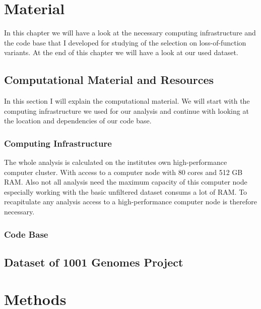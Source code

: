 \chapter{Material}
In this chapter we will have a look at the necessary computing infrastructure and the code base that I developed for studying of the selection on loss-of-function variants. At the end of this chapter we will have a look at our used dataset.
\section{Computational Material and Resources}
In this section I will explain the computational material. We will start with the computing infrastructure we used for our analysis and continue with looking at the location and dependencies of our code base.
\subsection{Computing Infrastructure}
The whole analysis is calculated on the institutes own high-performance computer cluster. With access to a computer node with 80 cores and 512 GB RAM. Also not all analysis need the maximum capacity of this computer node especially working with the basic unfiltered dataset consums a lot of RAM. To recapitulate any analysis access to a high-performance computer node is therefore necessary. 
\subsection{Code Base}
\section{Dataset of 1001 Genomes Project}
\chapter{Methods}